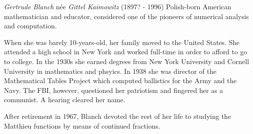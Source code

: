 \documentclass[12pt]{article}
\begin{document}
\emph{Gertrude Blanch} n\'ee \emph{Gittel Kaimowitz} (1897? - 1996) Polish-born American mathematician and educator, considered one of the pioneers of numerical analysis and computation.

When she was barely 10-years-old, her family moved to the United States. She attended a high school in New York and worked full-time in order to afford to go to college. In the 1930s she earned degrees from New York University and Cornell University in mathematics and phsyics. In 1938 she was director of the Mathematical Tables Project which computed ballistics for the Army and the Navy. The FBI, however, questioned her patriotism and fingered her as a communist. A hearing cleared her name.

After retirement in 1967, Blanch devoted the rest of her life to studying the Matthieu functions by means of continued fractions.
\end{document}
